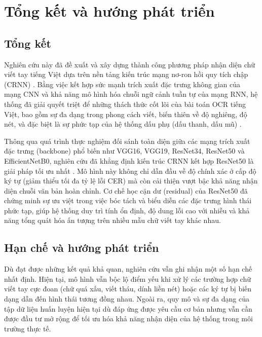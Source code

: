 \chapter{Tổng kết và hướng phát triển} %

\label{Chapter5} %


\renewcommand{\keyword}[1]{\textbf{#1}}
\renewcommand{\tabhead}[1]{\textbf{#1}}
\renewcommand{\code}[1]{\texttt{#1}}
\renewcommand{\file}[1]{\texttt{\bfseries#1}}
\renewcommand{\option}[1]{\texttt{\itshape#1}}

\section{Tổng kết}

Nghiên cứu này đã đề xuất và xây dựng thành công phương pháp nhận diện chữ viết tay tiếng Việt dựa trên nền tảng kiến trúc mạng nơ-ron hồi quy tích chập (CRNN) \cite{Reference5}. Bằng việc kết hợp sức mạnh trích xuất đặc trưng không gian của mạng CNN và khả năng mô hình hóa chuỗi ngữ cảnh tuần tự của mạng RNN, hệ thống đã giải quyết triệt để những thách thức cốt lõi của bài toán OCR tiếng Việt, bao gồm sự đa dạng trong phong cách viết, biến thiên về độ nghiêng, độ nét, và đặc biệt là sự phức tạp của hệ thống dấu phụ (dấu thanh, dấu mũ) \cite{Reference5,Reference16}.

Thông qua quá trình thực nghiệm đối sánh toàn diện giữa các mạng trích xuất đặc trưng (backbone) phổ biến như VGG16, VGG19, ResNet34, ResNet50 và EfficientNetB0, nghiên cứu đã khẳng định kiến trúc CRNN kết hợp ResNet50 là giải pháp tối ưu nhất \cite{Reference23,Reference24,Reference25}. Mô hình này không chỉ dẫn đầu về độ chính xác ở cấp độ ký tự (giảm thiểu tối đa tỷ lệ lỗi CER) mà còn cải thiện vượt bậc khả năng nhận diện chuỗi văn bản hoàn chỉnh. Cơ chế học cặn dư (residual) của ResNet50 đã chứng minh sự ưu việt trong việc bóc tách và biểu diễn các đặc trưng hình thái phức tạp, giúp hệ thống duy trì tính ổn định, độ dung lỗi cao với nhiễu và khả năng tổng quát hóa ấn tượng trên nhiều mẫu chữ viết tay khác nhau.

\section{Hạn chế và hướng phát triển}
Dù đạt được những kết quả khả quan, nghiên cứu vẫn ghi nhận một số hạn chế nhất định. Hiện tại, mô hình vẫn bộc lộ điểm yếu khi xử lý các trường hợp chữ viết tay cực đoan (chữ quá xấu, viết tháu, dính liền nét) hoặc các ký tự bị biến dạng dẫn đến hình thái tương đồng nhau. Ngoài ra, quy mô và sự đa dạng của tập dữ liệu huấn luyện hiện tại dù đáp ứng được yêu cầu cơ bản nhưng vẫn cần được đầu tư mở rộng để tối ưu hóa khả năng nhận diện của hệ thống trong môi trường thực tế.

